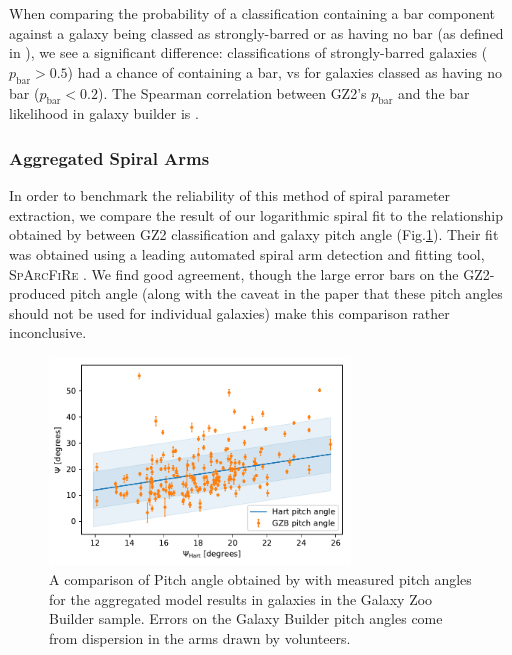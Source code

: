 \documentclass[../main.tex]{subfiles}
\begin{document}
When comparing the probability of a classification containing a bar component against a galaxy being classed as strongly-barred or as having no bar (as defined in \citealt{Masters2010:1003.0449v2}), we see a significant difference: classifications of strongly-barred galaxies ($p_\text{bar} > 0.5$) had a  chance of containing a bar, vs  for galaxies classed as having no bar ($p_\text{bar} < 0.2$). The Spearman correlation between GZ2's $p_\text{bar}$ and the bar likelihood in galaxy builder is .


\subsubsection{Aggregated Spiral Arms}
In order to benchmark the reliability of this method of spiral parameter extraction, we compare the result of our logarithmic spiral fit to the relationship obtained by \citet{Hart2016:1607.01019v1} between GZ2 classification and galaxy pitch angle (Fig.\ref{fig:hart_pitch_angle}). Their fit was obtained using a leading automated spiral arm detection and fitting tool, \textsc{SpArcFiRe} \citep{Davis2014:1402.1910v1}. We find good agreement, though the large error bars on the GZ2-produced pitch angle (along with the caveat in the paper that these pitch angles should not be used for individual galaxies) make this comparison rather inconclusive.

\begin{figure}
  \includegraphics[width=8cm]{images__results/pitch-angle-comparison.pdf}
  \caption{A comparison of Pitch angle obtained by \citet{Hart2016:1607.01019v1} with measured pitch angles for the aggregated model results in galaxies in the Galaxy Zoo Builder sample. Errors on the Galaxy Builder pitch angles come from dispersion in the arms drawn by volunteers.}
  \label{fig:hart_pitch_angle}
\end{figure}
\end{document}
